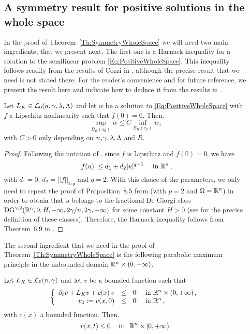 \subsection{A symmetry result for positive solutions in the whole space}

In the proof of Theorem~\ref{Th:SymmetryWholeSpace} we will need two main ingredients, that we present next. The first one is a Harnack inequality for a solution to the semilinear problem \eqref{Eq:PositiveWholeSpace}. This inequality follows readily from the results of Cozzi in \cite{Cozzi-DeGiorgiClassesLong}, although the precise result that we need is not stated there. For the reader's convenience and for future reference, we present the result here and indicate how to deduce it from the results in \cite{Cozzi-DeGiorgiClassesLong}.

\begin{proposition}
	\label{Prop:HarnackSemilinear}
	Let $L_K\in\mathcal{L}_0(n,\gamma,\lambda,\Lambda)$ and let $w$ be a solution to \eqref{Eq:PositiveWholeSpace} with $f$ a Lipschitz nonlinearity such that $f(0) = 0$. Then, 
	$$ \sup_{B_R(x_0)} w \leq C  \inf_{B_R(x_0)} w, $$
	with $C>0$ only depending on $n,\gamma,\lambda,\Lambda$ and $R$.
\end{proposition}

\begin{proof}
	Following the notation of \cite{Cozzi-DeGiorgiClassesLong}, since $f$ is Lipschitz and $f(0) = 0$, we have
	$$
	|f(u)|\leq d_1 + d_2 |u|^{q-1} \quad \text{ in } \mathbb{R}^n\,,
	$$ 
	with $d_1=0$, $d_2 =||f||_{\mathrm{Lip}}$ and $q=2$. With this choice of the parameters, we only need to repeat the proof of Proposition~8.5 from \cite{Cozzi-DeGiorgiClassesLong} (with $p=2$ and $\Omega = \mathbb{R}^n$) in order to obtain that $u$ belongs to the fractional De Giorgi class $\mathrm{DG}^{\gamma,2} ( \mathbb{R}^n , 0, H, -\infty,2\gamma/n,2\gamma,+\infty)$	for some constant $H>0$ (see \cite{Cozzi-DeGiorgiClassesLong} for the precise definition of these classes). Therefore, the Harnack inequality follows from Theorem~6.9 in \cite{Cozzi-DeGiorgiClassesLong}.
\end{proof}


The second ingredient that we need in the proof of Theorem~\ref{Th:SymmetryWholeSpace} is the following parabolic maximum principle in the unbounded domain $\mathbb{R}^n \times (0,+\infty)$. 

\begin{proposition}
	\label{Prop:ParaMaxPrp}
	Let $L_K \in \mathcal{L}_0(n,\gamma)$ and let $v$ be a bounded function such that
	\begin{equation*}
	\left\{\begin{array}{rcll}
	\partial_t v + L_K  v + c(x)\,v &\leq& 0 & \textrm{ in }\mathbb{R}^n\times(0,+\infty)\,,\\
	v_0:=v(x,0) &\leq& 0 & \textrm{ in } \mathbb{R}^n\,,
	\end{array} \right.
	\end{equation*}
	with $c(x)$ a bounded function. Then,
	$$ v(x,t) \leq 0 \,\,\,\,\,\text{ in } \,\,\, \mathbb{R}^n\times[0,+\infty). $$
\end{proposition}

